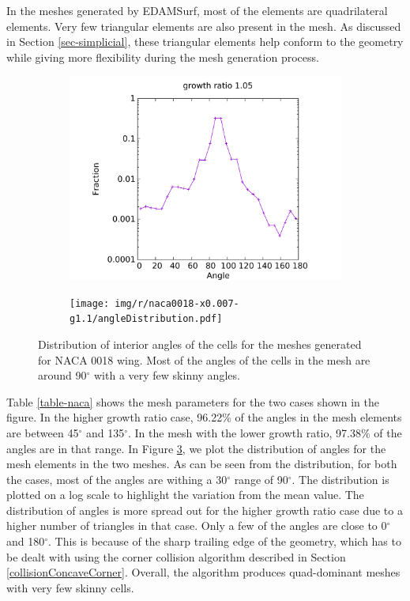 In the meshes generated by EDAMSurf, most of the elements are quadrilateral elements. Very few triangular elements are also present in the mesh. As discussed in Section \ref{sec-simplicial}, these triangular elements help conform to the geometry while giving more flexibility during the mesh generation process.

\begin{figure}[!hbt]
	\centering
	\begin{subfigure}{0.5\textwidth}
		\centering
		\includegraphics[width=0.9\linewidth]{img/r/naca0018-x0.007-g1.05/angleDistribution.pdf}
		\caption{}
		\label{fig-dist-low}
	\end{subfigure}%
	\begin{subfigure}{0.5\textwidth}
		\centering
		\texttt{[image: img/r/naca0018-x0.007-g1.1/angleDistribution.pdf]}
		\caption{}
		\label{fig-dist-high}
	\end{subfigure}
	\caption[Interior angle distribution of EDAMSurf of NACA0018 wing geometry.]{Distribution of interior angles of the cells for the meshes generated for NACA 0018 wing. Most of the angles of the cells in the mesh are around 90$^\circ$ with a very few skinny angles.}
	\label{fig-angle-distribution}
\end{figure}

Table \ref{table-naca} shows the mesh parameters for the two cases shown in the figure. In the higher growth ratio case, 96.22\% of the angles in the mesh elements are between 45$^\circ$ and 135$^\circ$. In the mesh with the lower growth ratio, 97.38\% of the angles are in that range. In Figure \ref{fig-angle-distribution}, we plot the distribution of angles for the mesh elements in the two meshes. As can be seen from the distribution, for both the cases, most of the angles are withing a 30$^\circ$ range of 90$^\circ$. The distribution is plotted on a log scale to highlight the variation from the mean value. The distribution of angles is more spread out for the higher growth ratio case due to a higher number of triangles in that case. Only a few of the angles are close to 0$^\circ$ and 180$^\circ$. This is because of the sharp trailing edge of the geometry, which has to be dealt with using the corner collision algorithm described in Section \ref{collisionConcaveCorner}. Overall, the algorithm produces quad-dominant meshes with very few skinny cells.

